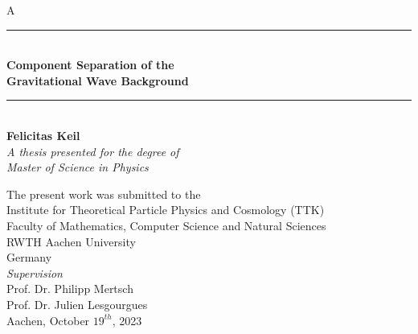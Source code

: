 \documentclass[twoside, 11pt, English, openany]{book}
\begin{document}
\begin{titlepage}
    \begin{spacing}{1.5}
        \color{white}
        A \\
        \color{black}
    \begin{center}
        \vspace{3cm}
        \noindent\rule{6cm}{0.4pt} \\
       {\LARGE \textbf{ Component Separation of the \\ 
       \vspace{0.5cm}
      Gravitational Wave Background}}
        \noindent\rule{6cm}{0.4pt} \\
        
       \vspace{1cm}
       \large{\textbf{Felicitas Keil}} \\
       \vspace{3cm}        
       \textit{A thesis presented for the degree of\\
       Master of Science in Physics}
            
       \vspace{0.8cm}
       \small{The present work was submitted to the \\
        Institute for Theoretical Particle Physics and Cosmology (TTK)\\
       Faculty of Mathematics, Computer Science and Natural Sciences \\
       RWTH Aachen University\\
       Germany\\
       }
       \vspace{3cm}
       \textit{Supervision} \\
       \large{Prof. Dr. Philipp Mertsch \\
       Prof. Dr. Julien Lesgourgues \\
       }
       \vspace{1cm}
       \small{Aachen, October $19^{th}$, 2023}
       \vspace{-2cm}
    \end{center}
    \end{spacing}
\end{titlepage}
\end{document}
